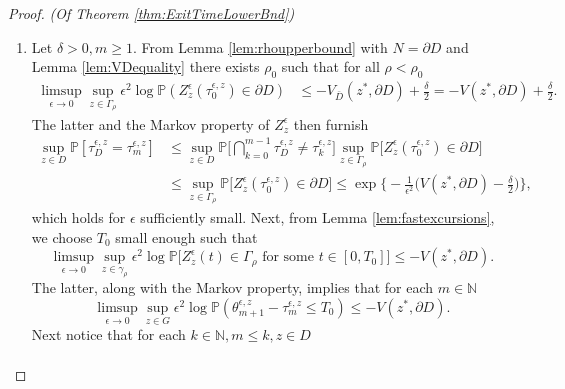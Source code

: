 \documentclass[10pt, reqno]{amsart}
\newcommand{\N}{\mathbb{N}}
\newcommand{\pr}{\mathbb{P}}
\theoremstyle{definition}
\numberwithin{lem}{section}
\numberwithin{cor}{section}
\numberwithin{prop}{section}
\numberwithin{thm}{section}
\numberwithin{dfn}{section}
\begin{document}
\begin{proof}{\textit{(Of Theorem \ref{thm:ExitTimeLowerBnd})}}
\begin{enumerate}
    \item Let $\delta>0, m\geq 1.$ From Lemma \ref{lem:rhoupperbound} with $N=\partial D$ and Lemma \ref{lem:VDequality} there exists $\rho_0$ such that for all $\rho<\rho_0$
    \begin{equation*}
    \begin{aligned}
         \limsup_{\epsilon \to 0} \sup_{z \in \Gamma_\rho} \epsilon^2 \log \pr\left( Z^\epsilon_z(\tau^{\epsilon,z}_0) \in \partial D\right) &\leq -  V_{\bar{D}}(z^*,\partial D)+\frac{\delta}{2}
         =-  V(z^*,\partial D)+\frac{\delta}{2}.
    \end{aligned}       
    \end{equation*}
The latter and the Markov property of $Z^\epsilon_z$ then furnish 
\begin{equation}\label{eq:lbaux1}
    \begin{aligned}
        \sup_{z\in D}\pr[\tau_D^{\epsilon,z}=\tau^{\epsilon,z}_{m}]&\leq \sup_{z\in D}\pr\bigg[\bigcap_{k=0}^{m-1}\tau_D^{\epsilon,z}\neq\tau^{\epsilon,z}_{k}\bigg]\sup_{z\in \Gamma_\rho}\pr\big[ Z^\epsilon_z(\tau^{\epsilon,z}_{0})\in\partial D\big]\\&
        \leq \sup_{z\in \Gamma_\rho}\pr\big[ Z^\epsilon_z(\tau^{\epsilon,z}_{0})\in\partial D\big]\leq \exp\bigg\{-\frac{1}{\epsilon^2}\bigg( V(z^*,\partial D)-\frac{\delta}{2}\bigg)\bigg\},
    \end{aligned}
\end{equation}
which holds for $\epsilon$ sufficiently small. Next, from Lemma \ref{lem:fastexcursions}, we choose $T_0$ small enough such that
\begin{equation*}
         \limsup_{\epsilon \to 0} \sup_{z \in \gamma_\rho} \epsilon^2 \log \pr\bigg[Z^{\epsilon}_z(t) \in \Gamma_\rho \text{ for some } t \in [0,T_0]\bigg]\leq-V(z^*,\partial D).
    \end{equation*}
The latter, along with the Markov property, implies that for each $m\in\N$
\begin{equation}\label{eq:lbaux2}
         \limsup_{\epsilon \to 0} \sup_{z \in G} \epsilon^2 \log \pr\left(\theta^{\epsilon,z}_{m+1}-\tau^{\epsilon,z}_{m} \leq T_0\right)\leq-V(z^*,\partial D).
    \end{equation}
Next notice that for each $k\in\N, m\leq k, z\in D$
\begin{equation*}
    \begin{aligned}

\end{aligned}
\end{equation*}
\end{enumerate}
\end{proof}
\end{document}
